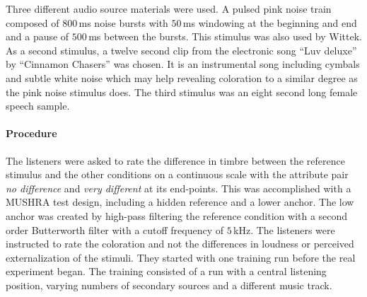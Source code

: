 Three different audio source materials were used.
A pulsed pink noise train composed of $800$\,ms noise bursts with $50$\,ms windowing
at the beginning and end and a pause of $500$\,ms between the bursts. This
stimulus was also used by Wittek.\autocite[][Sec.\,8.2]{Wittek2007}
As a second stimulus, a twelve second clip from the electronic song ``Luv
deluxe'' by ``Cinnamon Chasers'' was chosen. It is an instrumental song including
cymbals and subtle white noise which may help revealing coloration to a similar
degree as the pink noise stimulus does. The third stimulus was an eight second long
female speech sample.

\paragraph{Procedure}
%
The listeners were asked to rate the difference in timbre between the
reference stimulus and the other conditions on a continuous scale with
the attribute pair \emph{no difference} and \emph{very different} at its
end-points. This was accomplished with a {\small MUSHRA}
test design, including a hidden reference and a lower anchor.
The low anchor was created by high-pass
filtering the reference condition with a second order Butterworth filter with a cutoff
frequency of $5$\,kHz. The listeners were instructed to rate the
coloration and not the differences in loudness or perceived externalization of
the stimuli.
They started with one training run before the real experiment began. The
training consisted of a run with a central listening position, varying numbers of
secondary sources and a different music track.

